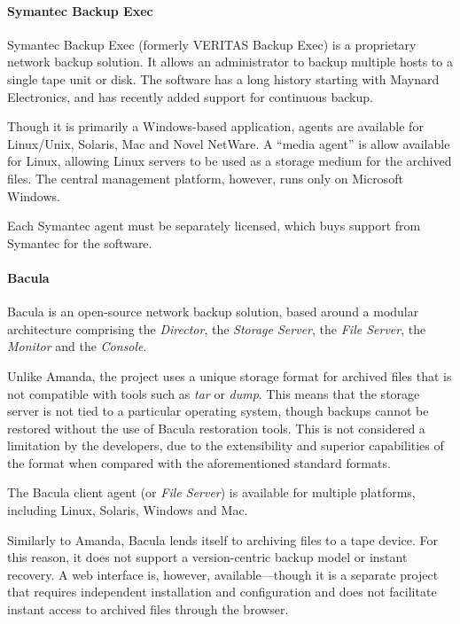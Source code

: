 \begin{bibunit}[plain]
\paragraph{Symantec Backup Exec}

Symantec Backup Exec (formerly VERITAS Backup Exec) is a proprietary network
backup solution. It allows an administrator to backup multiple hosts to
a single tape unit or disk. The software has a long history starting with
Maynard Electronics, and has recently added support for continuous backup.

Though it is primarily a Windows-based application, agents are available for
Linux/Unix, Solaris, Mac and Novel NetWare. A ``media agent'' is allow
available for Linux, allowing Linux servers to be used as a storage medium for
the archived files. The central management platform, however, runs only on
Microsoft Windows.

Each Symantec agent must be separately licensed, which buys support from
Symantec for the software.

\paragraph{Bacula}

Bacula is an open-source network backup solution, based around a modular
architecture comprising the \emph{Director}, the \emph{Storage Server}, the
\emph{File Server}, the \emph{Monitor} and the \emph{Console}.

Unlike Amanda, the project uses a unique storage format for archived files that
is not compatible with tools such as \emph{tar} or \emph{dump}. This means that
the storage server is not tied to a particular operating system, though backups
cannot be restored without the use of Bacula restoration tools. This is not
considered a limitation by the developers, due to the extensibility and
superior capabilities of the format when compared with the aforementioned
standard formats.

The Bacula client agent (or \emph{File Server}) is available for multiple platforms,
including Linux, Solaris, Windows and Mac.

Similarly to Amanda, Bacula lends itself to archiving files to a tape device.
For this reason, it does not support a version-centric backup model or instant
recovery. A web interface is, however, available---though it is a separate
project that requires independent installation and configuration and does not
facilitate instant access to archived files through the browser.


\end{bibunit}

